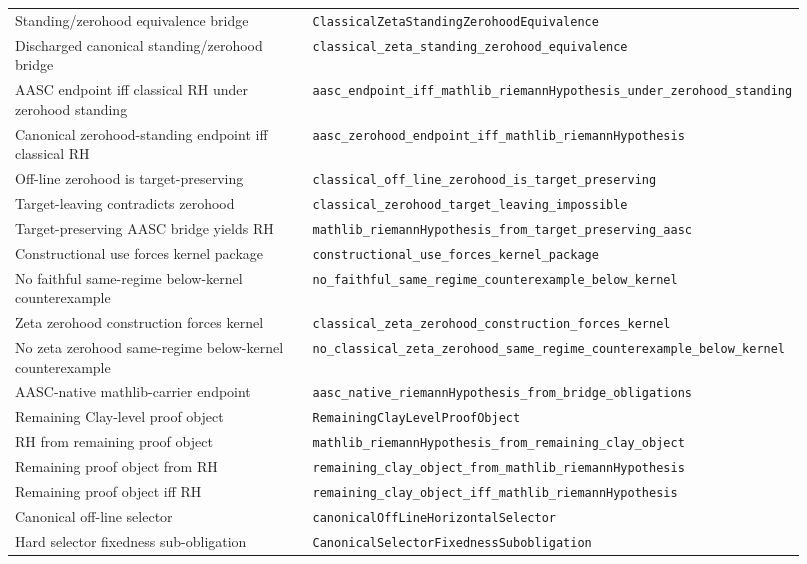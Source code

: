 \documentclass[11pt]{article}
\begin{document}
\begin{center}
\begin{longtable}{p{0.44\linewidth}p{0.48\linewidth}}
Standing/zerohood equivalence bridge
  & \texttt{ClassicalZetaStandingZerohoodEquivalence} \\
Discharged canonical standing/zerohood bridge
  & \texttt{classical\_zeta\_standing\_zerohood\_equivalence} \\
AASC endpoint iff classical RH under zerohood standing
  & \texttt{aasc\_endpoint\_iff\_mathlib\_riemannHypothesis\_under\_zerohood\_standing} \\
Canonical zerohood-standing endpoint iff classical RH
  & \texttt{aasc\_zerohood\_endpoint\_iff\_mathlib\_riemannHypothesis} \\
Off-line zerohood is target-preserving
  & \texttt{classical\_off\_line\_zerohood\_is\_target\_preserving} \\
Target-leaving contradicts zerohood
  & \texttt{classical\_zerohood\_target\_leaving\_impossible} \\
Target-preserving AASC bridge yields RH
  & \texttt{mathlib\_riemannHypothesis\_from\_target\_preserving\_aasc} \\
Constructional use forces kernel package
  & \texttt{constructional\_use\_forces\_kernel\_package} \\
No faithful same-regime below-kernel counterexample
  & \texttt{no\_faithful\_same\_regime\_counterexample\_below\_kernel} \\
Zeta zerohood construction forces kernel
  & \texttt{classical\_zeta\_zerohood\_construction\_forces\_kernel} \\
No zeta zerohood same-regime below-kernel counterexample
  & \texttt{no\_classical\_zeta\_zerohood\_same\_regime\_counterexample\_below\_kernel} \\
AASC-native mathlib-carrier endpoint
  & \texttt{aasc\_native\_riemannHypothesis\_from\_bridge\_obligations} \\
Remaining Clay-level proof object
  & \texttt{RemainingClayLevelProofObject} \\
RH from remaining proof object
  & \texttt{mathlib\_riemannHypothesis\_from\_remaining\_clay\_object} \\
Remaining proof object from RH
  & \texttt{remaining\_clay\_object\_from\_mathlib\_riemannHypothesis} \\
Remaining proof object iff RH
  & \texttt{remaining\_clay\_object\_iff\_mathlib\_riemannHypothesis} \\
Canonical off-line selector
  & \texttt{canonicalOffLineHorizontalSelector} \\
Hard selector fixedness sub-obligation
  & \texttt{CanonicalSelectorFixednessSubobligation} \\

\end{longtable}
\end{center}
\end{document}
